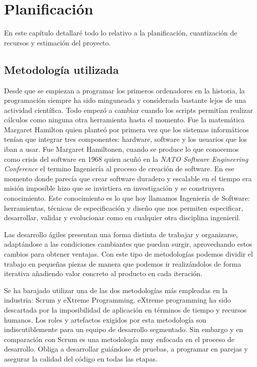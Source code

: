 \chapter{Planificación}
\label{sec:plani}
En este capítulo detallaré todo lo relativo a la planificación, cuantización de recursos y
estimación del proyecto. 

\section{Metodología utilizada}
\label{sec:meto}
Desde que se empiezan a programar los primeros ordenadores en la historia, la programación
siempre ha sido minguneada y considerada bastante lejos de una actividad científica. Todo
empezó a cambiar cuando los scripts permitían realizar cálculos como ninguna otra
herramienta hasta el momento. Fue la matemática Margaret Hamilton quien planteó por
primera vez que los sistemas informáticos tenían que integrar tres componentes: hardware,
software y los usuarios que los iban a usar. Fue Margaret Hamiltonen, cuando se produce lo
que conocemos como crisis del software en 1968 quien acuñó en la \textit{NATO Software
Engineering Conference} el termino Ingeniería al proceso de creación de software. En ese
momento donde parecía que crear software duradero y escalable en el tiempo era misión
imposible hizo que se invirtiera en investigación y se construyera conocimiento. Este
conocimiento es lo que hoy llamamos Ingeniería de Software: herramientas, técnicas de
especificación y diseño que nos permiten especificar, desarrollar, validar y evolucionar
como en cualquier otra disciplina ingenieril.

Las desarrollo ágiles presentan una forma distinta de trabajar y organizarse, adaptándose
a las condiciones cambiantes que puedan surgir, aprovechando estos cambios para obtener
ventajas. Con este tipo de metodologías podemos dividir el trabajo en pequeñas piezas de
manera que podemos ir realizándolos de forma iterativa añadiendo valor concreto al
producto en cada iteración.

Se ha barajado utilizar una de las dos metodologías más empleadas en la industria: Scrum y
eXtreme Programming. eXtreme programming ha sido descartada por la imposibilidad de
aplicación en términos de tiempo y recursos humanos. Los roles y artefactos exigidos por
esta metodología son indiscutiblemente para un equipo de desarrollo segmentado. Sin
embargo y en comparación con Scrum es una metodología muy enfocada en el proceso de
desarrollo. Obliga a desarrollar guiándose de pruebas, a programar en parejas y asegurar
la calidad del código en todas las etapas.

